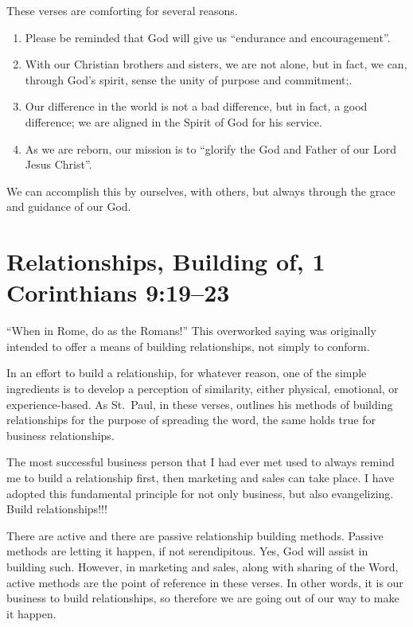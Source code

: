 \documentclass[12pt]{memoir}
\begin{document}
These verses are comforting for several reasons.

\begin{enumerate}
\item Please be reminded that God will give us ``endurance and encouragement''. 

\item With our Christian brothers and sisters, we are not alone, but in fact, we can, through God's spirit, sense the unity of purpose and commitment;.

\item Our difference in the world is not a bad difference, but in fact, a good difference; we are aligned in the Spirit of God for his service.

\item As we are reborn, our mission is to ``glorify the God and Father of our Lord Jesus Christ''.
\end{enumerate}

We can accomplish this by ourselves, with others, but always through the grace and guidance of our God.

\section[Relationships, Building of]{Relationships, Building of, 1 Corinthians 9:19--23}

``When in Rome, do as the Romans!'' This overworked saying was originally
intended to offer a means of building relationships, not simply to
conform.

In an effort to build a relationship, for whatever reason, one of
the simple ingredients is to develop a perception of similarity, either
physical, emotional, or experience-based.
As St.~Paul, in these verses,
outlines his methods of building relationships for the purpose of
spreading the word, the same holds true for business relationships.

The most successful business person that I had ever met used to always remind me to build a relationship first, then marketing and sales can take place.
I have adopted this fundamental principle for not only business, but also evangelizing.
Build relationships!!!

There are active and there are passive relationship building methods.
Passive methods are letting it happen, if not serendipitous.
Yes, God will assist in building such.
However, in marketing and sales, along with sharing of the Word, active methods are the point of reference in these verses.
In other words, it is our business to build relationships, so therefore we are going out of our way to make it happen.
\end{document}
